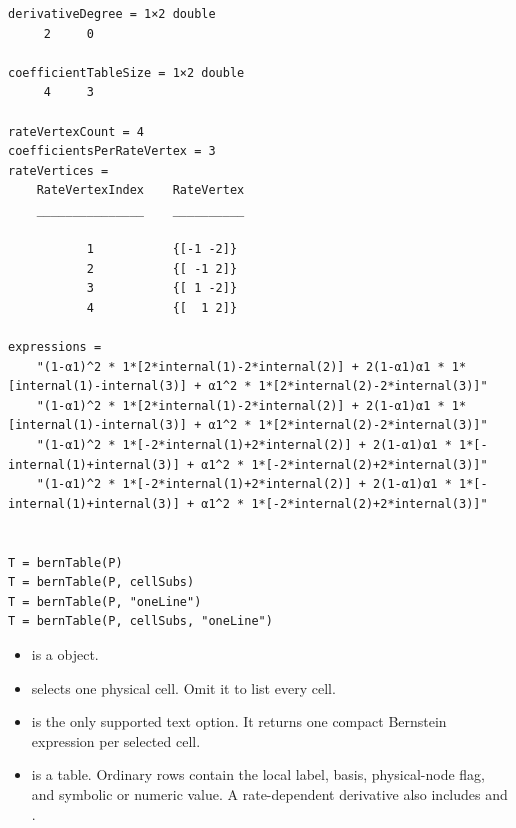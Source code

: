 \begin{lstlisting}[style=dpwideoutput]
derivativeDegree = 1×2 double
     2     0

coefficientTableSize = 1×2 double
     4     3

rateVertexCount = 4
coefficientsPerRateVertex = 3
rateVertices =
    RateVertexIndex    RateVertex
    _______________    __________

           1           {[-1 -2]}
           2           {[ -1 2]}
           3           {[ 1 -2]}
           4           {[  1 2]}

expressions =
    "(1-α1)^2 * 1*[2*internal(1)-2*internal(2)] + 2(1-α1)α1 * 1*[internal(1)-internal(3)] + α1^2 * 1*[2*internal(2)-2*internal(3)]"
    "(1-α1)^2 * 1*[2*internal(1)-2*internal(2)] + 2(1-α1)α1 * 1*[internal(1)-internal(3)] + α1^2 * 1*[2*internal(2)-2*internal(3)]"
    "(1-α1)^2 * 1*[-2*internal(1)+2*internal(2)] + 2(1-α1)α1 * 1*[-internal(1)+internal(3)] + α1^2 * 1*[-2*internal(2)+2*internal(3)]"
    "(1-α1)^2 * 1*[-2*internal(1)+2*internal(2)] + 2(1-α1)α1 * 1*[-internal(1)+internal(3)] + α1^2 * 1*[-2*internal(2)+2*internal(3)]"
\end{lstlisting}

\section{\texorpdfstring{}{bernTable}}
\label{sec:pdvar-table}

\syntaxhead
\begin{lstlisting}[style=dpsyntax]
T = bernTable(P)
T = bernTable(P, cellSubs)
T = bernTable(P, "oneLine")
T = bernTable(P, cellSubs, "oneLine")
\end{lstlisting}

\arghead
\begin{itemize}[leftmargin=*]
  \item {} is a  object. \item {} selects one physical cell. Omit it to list every cell. \item {} is the only supported text option.  It returns one compact Bernstein expression per selected cell. \item {} is a table.  Ordinary rows contain the local label, basis, physical-node flag, and symbolic or numeric value.  A rate-dependent derivative also includes  and .
\end{itemize}

